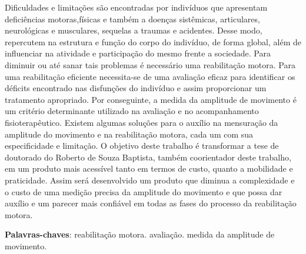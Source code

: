 \begin{resumo}

Dificuldades e limitações são encontradas por indivíduos que apresentam deficiências
 motoras,físicas e também a doenças sistêmicas, articulares, neurológicas e musculares,
 sequelas a traumas e acidentes. Desse modo, repercutem na estrutura e função do corpo
 do indivíduo, de forma global, além de influenciar na atividade e participação do
 mesmo frente a sociedade. Para diminuir ou até sanar tais problemas é necessário uma
 reabilitação motora. Para uma reabilitação eficiente necessita-se de uma avaliação
 eficaz para identificar os déficits encontrado nas disfunções do indivíduo e assim 
proporcionar um tratamento apropriado. Por conseguinte, a medida da amplitude de
 movimento é um critério determinante utilizado na avaliação e no acompanhamento
 fisioterapêutico. Existem algumas soluções para o auxílio na mensuração da amplitude
 do movimento e na reabilitação motora, cada um com sua especificidade e limitação. 
O objetivo deste trabalho é transformar a tese de doutorado do Roberto de Souza Baptista, 
também coorientador deste trabalho, em um produto mais acessível tanto em termos de custo,
 quanto a mobilidade e praticidade. Assim será desenvolvido um produto que diminua a 
complexidade e o custo de uma medição precisa da amplitude do movimento e que possa
 dar auxílio e um parecer mais confiável em todas as fases do processo da reabilitação motora.
 \vspace{\onelineskip}
    
 \noindent
 \textbf{Palavras-chaves}: reabilitação motora. avaliação. medida da amplitude de movimento.
\end{resumo}
